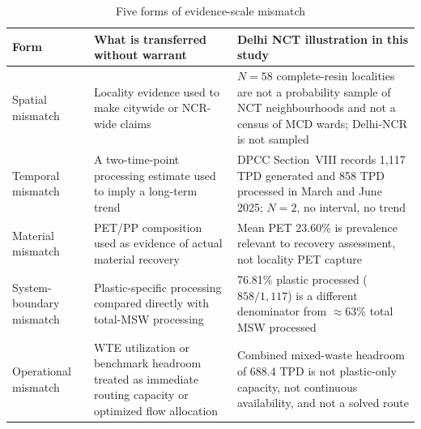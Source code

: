 \documentclass[12pt,a4paper]{article}
\begin{document}
\begin{table}[htbp]
\centering
\caption{Five forms of evidence-scale mismatch}
\label{tab:mismatch}
\begin{tabular}{L{2.6cm}L{6.2cm}L{5.0cm}}
\toprule
\textbf{Form} & \textbf{What is transferred without warrant} & \textbf{Delhi NCT illustration in this study} \\
\midrule
Spatial mismatch & Locality evidence used to make citywide or NCR-wide claims & $N=58$ complete-resin localities are not a probability sample of NCT neighbourhoods and not a census of MCD wards; Delhi-NCR is not sampled \\
Temporal mismatch & A two-time-point processing estimate used to imply a long-term trend & DPCC Section~VIII records 1,117 TPD generated and 858 TPD processed in March and June 2025; $N=2$, no interval, no trend \\
Material mismatch & PET/PP composition used as evidence of actual material recovery & Mean PET 23.60\% is prevalence relevant to recovery assessment, not locality PET capture \\
System-boundary mismatch & Plastic-specific processing compared directly with total-MSW processing & 76.81\% plastic processed ($858/1{,}117$) is a different denominator from $\approx$63\% total MSW processed \\
Operational mismatch & WTE utilization or benchmark headroom treated as immediate routing capacity or optimized flow allocation & Combined mixed-waste headroom of 688.4 TPD is not plastic-only capacity, not continuous availability, and not a solved route \\
\bottomrule
\end{tabular}
\end{table}
\end{document}
